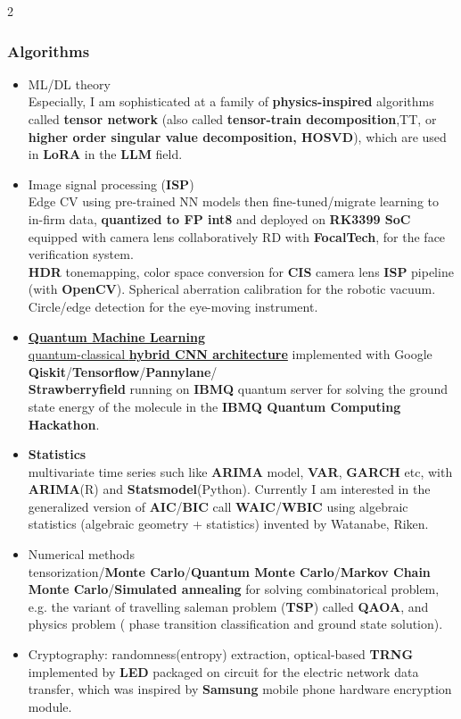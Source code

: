 \documentclass[11pt]{article}
\begin{document}
\begin{multicols*}{2}
\subsubsection*{Algorithms}
\begin{itemize}[noitemsep]
    \item ML/DL theory\\ Especially, I am sophisticated at a family of \textbf{physics-inspired} algorithms called \textbf{tensor network} (also called \textbf{tensor-train decomposition},TT, or \textbf{higher order singular value decomposition, HOSVD}), which are used in \textbf{LoRA} in the \textbf{LLM} field. 
    \item Image signal processing (\textbf{ISP}) \\
    Edge CV using pre-trained NN models then fine-tuned/migrate learning to in-firm data,\textbf{ quantized to FP int8 }and deployed on \textbf{RK3399 SoC} equipped with camera lens collaboratively RD with \textbf{FocalTech}, for the face verification system.\\
    \textbf{HDR} tonemapping, color space conversion for \textbf{CIS} camera lens \textbf{ISP} pipeline (with \textbf{OpenCV}). Spherical aberration calibration for the robotic vacuum. \\
    Circle/edge detection for the eye-moving instrument.  
    \item \href{https://github.com/Kuo-TingKai/IBMQcamp2020_VQE_team}{\textbf{Quantum Machine Learning}\\ quantum-classical\textbf{ hybrid CNN architecture}} implemented with Google \textbf{Qiskit}/\textbf{Tensorflow}/\textbf{Pannylane}/\\\textbf{Strawberryfield} running on \textbf{IBMQ} quantum server for solving the ground state energy of the molecule in the \textbf{IBMQ Quantum Computing Hackathon}.\\
    \item \textbf{Statistics}\\ multivariate time series such like \textbf{ARIMA} model, \textbf{VAR}, \textbf{GARCH} etc, with \textbf{ARIMA}(R) and \textbf{Statsmodel}(Python). Currently I am interested in the generalized version of \textbf{AIC}/\textbf{BIC} call \textbf{WAIC}/\textbf{WBIC} using algebraic statistics (algebraic geometry + statistics) invented by Watanabe, Riken.
    \item Numerical methods\\tensorization/\textbf{Monte Carlo}/\textbf{Quantum Monte Carlo}/\textbf{Markov Chain Monte Carlo}/\textbf{Simulated annealing} for solving combinatorical problem, e.g. the variant of travelling saleman problem (\textbf{TSP}) called \textbf{QAOA}, and physics problem ( phase transition classification and ground state solution).
    \item Cryptography: randomness(entropy) extraction, optical-based \textbf{TRNG} implemented by \textbf{LED} packaged on circuit for the electric network data transfer, which was inspired by \textbf{Samsung} mobile phone hardware encryption module.
\end{itemize}


\end{multicols*}
\end{document}
